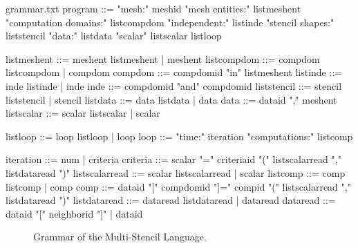 \begin{filecontents*}{grammar.txt}
program ::= "mesh:" meshid 
            "mesh entities:" listmeshent
            "computation domains:" 
                      listcompdom
            "independent:"
                      listinde
            "stencil shapes:"
                      liststencil
            "data:" listdata
            "scalar" listscalar
            listloop

listmeshent ::= meshent listmeshent 
                        |  meshent
listcompdom ::= compdom listcompdom 
                        |  compdom
compdom ::= compdomid "in" listmeshent
listinde ::= inde listinde |  inde
inde ::= compdomid "and" compdomid
liststencil ::= stencil liststencil 
                        | stencil
listdata ::= data listdata |  data
data ::= dataid "," meshent
listscalar ::= scalar listscalar 
                      | scalar

listloop ::= loop listloop | loop
loop ::=  "time:" iteration
          "computations:" listcomp
          
iteration ::= num | criteria
criteria ::= scalar "=" criteriaid "(" 
                    listscalarread "," 
                    listdataread ")"
listscalarread ::= scalar listscalarread 
                          |  scalar
listcomp ::= comp listcomp |  comp
comp ::= dataid "[" compdomid "]=" 
                    compid "(" 
                    listscalarread "," 
                    listdataread ")"
listdataread ::= dataread listdataread 
                          |  dataread
dataread ::= dataid "[" neighborid "]" 
              |  dataid
\end{filecontents*}

\begin{figure}[t]
  \hspace{5mm}
  \begin{minipage}[t]{\textwidth}
    {}   
    \caption{Grammar of the Multi-Stencil Language. \label{fig:grammar}}
  \end{minipage}
\end{figure}
